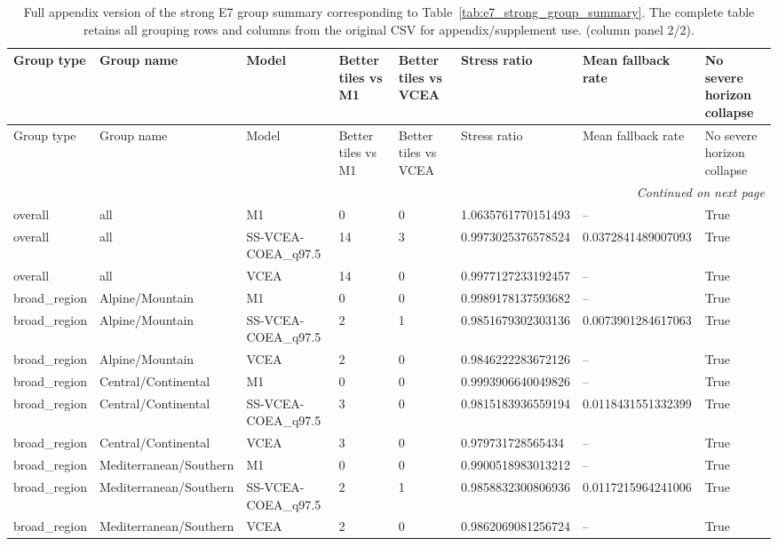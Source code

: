 \begin{landscape}
\scriptsize
\setlength{\LTleft}{0pt}
\setlength{\LTright}{0pt}
\begin{longtable}{llllllll}
\caption{Full appendix version of the strong E7 group summary corresponding to Table~\ref{tab:e7_strong_group_summary}. The complete table retains all grouping rows and columns from the original CSV for appendix/supplement use. (column panel 2/2).}\label{tab:e7_strong_group_summary_full_part2}\\
\toprule
Group type & Group name & Model & Better tiles vs M1 & Better tiles vs VCEA & Stress ratio & Mean fallback rate & No severe horizon collapse \\
\midrule
\endfirsthead
\toprule
Group type & Group name & Model & Better tiles vs M1 & Better tiles vs VCEA & Stress ratio & Mean fallback rate & No severe horizon collapse \\
\midrule
\endhead
\midrule
\multicolumn{8}{r}{\textit{Continued on next page}} \\
\endfoot
\bottomrule
\endlastfoot
overall & all & M1 & 0 & 0 & 1.0635761770151493 & -- & True \\
overall & all & SS-VCEA-COEA\_q97.5 & 14 & 3 & 0.9973025376578524 & 0.0372841489007093 & True \\
overall & all & VCEA & 14 & 0 & 0.9977127233192457 & -- & True \\
broad\_region & Alpine/Mountain & M1 & 0 & 0 & 0.9989178137593682 & -- & True \\
broad\_region & Alpine/Mountain & SS-VCEA-COEA\_q97.5 & 2 & 1 & 0.9851679302303136 & 0.0073901284617063 & True \\
broad\_region & Alpine/Mountain & VCEA & 2 & 0 & 0.9846222283672126 & -- & True \\
broad\_region & Central/Continental & M1 & 0 & 0 & 0.9993906640049826 & -- & True \\
broad\_region & Central/Continental & SS-VCEA-COEA\_q97.5 & 3 & 0 & 0.9815183936559194 & 0.0118431551332399 & True \\
broad\_region & Central/Continental & VCEA & 3 & 0 & 0.979731728565434 & -- & True \\
broad\_region & Mediterranean/Southern & M1 & 0 & 0 & 0.9900518983013212 & -- & True \\
broad\_region & Mediterranean/Southern & SS-VCEA-COEA\_q97.5 & 2 & 1 & 0.9858832300806936 & 0.0117215964241006 & True \\
broad\_region & Mediterranean/Southern & VCEA & 2 & 0 & 0.9862069081256724 & -- & True \\

\end{longtable}
\end{landscape}
